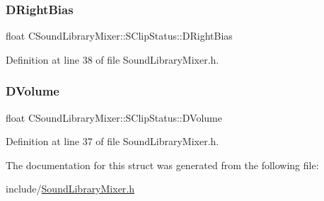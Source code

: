 \subsubsection{\texorpdfstring{D\+Right\+Bias}{DRightBias}}
{\footnotesize\ttfamily float C\+Sound\+Library\+Mixer\+::\+S\+Clip\+Status\+::\+D\+Right\+Bias}



Definition at line 38 of file Sound\+Library\+Mixer.\+h.

\hypertarget{structCSoundLibraryMixer_1_1SClipStatus_a2f44b601fef18f411ec68fb0da7ee1cf}{}\label{structCSoundLibraryMixer_1_1SClipStatus_a2f44b601fef18f411ec68fb0da7ee1cf} 
\subsubsection{\texorpdfstring{D\+Volume}{DVolume}}
{\footnotesize\ttfamily float C\+Sound\+Library\+Mixer\+::\+S\+Clip\+Status\+::\+D\+Volume}



Definition at line 37 of file Sound\+Library\+Mixer.\+h.



The documentation for this struct was generated from the following file\+:\begin{DoxyCompactItemize}
\item 
include/\hyperlink{SoundLibraryMixer_8h}{Sound\+Library\+Mixer.\+h}\end{DoxyCompactItemize}
